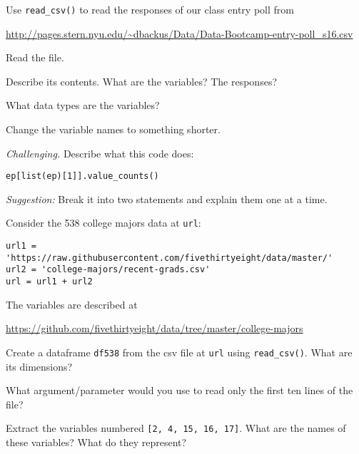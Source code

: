 \documentclass[11pt]{exam}
\begin{document}
\begin{questions}
\item Use \verb|read_csv()| to read the responses of our class entry poll from 

\vspace{0.1in}
\centerline{\url{http://pages.stern.nyu.edu/~dbackus/Data/Data-Bootcamp-entry-poll_s16.csv}}
\vspace{0.1in}

\begin{parts}
\item Read the file.
\item Describe its contents.  What are the variables?  The responses?
\item What data types are the variables?
\item Change the variable names to something shorter.
\item {\it Challenging.\/}
Describe what this code does:
\begin{verbatim}
ep[list(ep)[1]].value_counts()
\end{verbatim}
{\it Suggestion:\/} Break it into two statements and explain them one at a time.
\end{parts}


\item  Consider the 538 college majors data at {\tt url}:
\begin{verbatim}
url1 = 'https://raw.githubusercontent.com/fivethirtyeight/data/master/'
url2 = 'college-majors/recent-grads.csv'
url = url1 + url2
\end{verbatim}
The variables are described at

\vspace{0.1in}
\centerline{\url{https://github.com/fivethirtyeight/data/tree/master/college-majors}}
\vspace{0.1in}

\begin{parts}

\item Create a dataframe {\tt df538} from the csv file at {\tt url} using
\verb|read_csv()|.
What are its dimensions?

\item What argument/parameter would you use to read only
the first ten lines of the file?

\item Extract the variables numbered \texttt{[2, 4, 15, 16, 17]}.
What are the names of these variables?
What do they represent?


\end{parts}
\end{questions}
\end{document}
